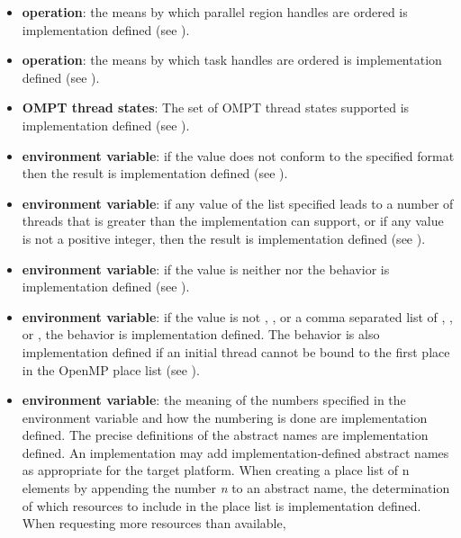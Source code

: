 \begin{itemize}
\item {} \textbf{operation}: the means by 
      which parallel region handles are ordered is implementation defined 
      (see ).
\item {} \textbf{operation}: the means by which 
      task handles are ordered is implementation defined (see
      ).
\item \textbf{OMPT thread states}: The set of OMPT thread states supported 
      is implementation defined (see ).
\item {} \textbf{environment variable}: if the value does not
      conform to the specified format then the result is implementation defined 
      (see ).
\item {} \textbf{environment variable}: if any value of the 
      list specified leads to a number of threads that is greater than the 
      implementation can support, or if any value is not a positive integer,
      then the result is implementation defined (see ).
\item {} \textbf{environment variable}: if the value is neither
       nor  the behavior is implementation defined (see
      ).
\item {} \textbf{environment variable}: if the value is not 
      , , or a comma separated list of , 
      , or , the behavior is implementation defined. 
      The behavior is also implementation defined if an initial thread cannot 
      be bound to the first place in the OpenMP place list (see 
      ).
\item {} \textbf{environment variable}: the meaning of the numbers 
      specified in the environment variable and how the numbering is done are 
      implementation defined. The precise definitions of the abstract names are 
      implementation defined. An implementation may add implementation-defined 
      abstract names as appropriate for the target platform. When creating a 
      place list of n elements by appending the number \emph{n} to an abstract 
      name, the determination of which resources to include in the place list 
      is implementation defined. When requesting more resources than available,

\end{itemize}
